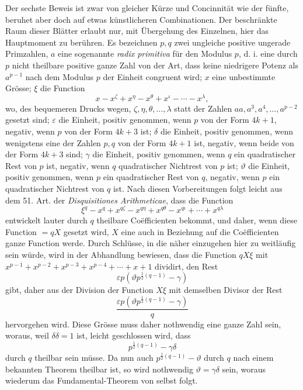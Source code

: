 \documentclass[12pt]{article}
\begin{document}
Der sechste Beweis ist zwar von gleicher Kürze und Concinnität wie der fünfte, beruhet aber doch auf etwas künstlicheren Combinationen. Der beschränkte Raum dieser Blätter erlaubt nur, mit Übergehung des Einzelnen, hier das Hauptmoment zu berühren. Es bezeichnen $p,q$ zwei ungleiche positive ungerade Primzahlen, $a$ eine sogenannte \textit{radix primitiva} für den Modulus $p$, d. i. eine durch $p$ nicht theilbare positive ganze Zahl von der Art, dass keine niedrigere Potenz als $a^{p-1}$ nach dem Modulus $p$ der Einheit congruent wird; $x$ eine unbestimmte Grösse; $\xi$ die Function
\[
x-x^\zeta+x^\eta-x^\theta+x^\iota-\cdots-x^\lambda,
\]
wo, des bequemeren Drucks wegen, $\zeta,\eta,\theta,\ldots,\lambda$ statt der Zahlen $aa,a^3,a^4,\ldots,a^{p-2}$ gesetzt sind; $\varepsilon$ die Einheit, positiv genommen, wenn $p$ von der Form $4k+1$, negativ, wenn $p$ von der Form $4k+3$ ist; $\delta$ die Einheit, positiv genommen, wenn wenigstens eine der Zahlen $p,q$ von der Form $4k+1$ ist, negativ, wenn beide von der Form $4k+3$ sind; $\gamma$ die Einheit, positiv genommen, wenn $q$ ein quadratischer Rest von $p$ ist, negativ, wenn $q$ quadratischer Nichtrest von $p$ ist; $\vartheta$ die Einheit, positiv genommen, wenn $p$ ein quadratischer Rest von $q$, negativ, wenn $p$ ein quadratischer Nichtrest von $q$ ist. Nach diesen Vorbereitungen folgt leicht aus dem 51. Art. der \textit{Disquisitiones Arithmeticae}, dass die Function
\[
\xi^q-x^q+x^{q\zeta}-x^{q\eta}+x^{q\theta}-x^{q\iota}+\cdots+x^{q\lambda}
\]
entwickelt lauter durch $q$ theilbare Coëfficienten bekommt, und daher, wenn diese Function $=qX$ gesetzt wird, $X$ eine auch in Beziehung auf die Coëfficienten ganze Function werde. Durch Schlüsse, in die näher einzugehen hier zu weitläufig sein würde, wird in der Abhandlung bewiesen, dass die Function $qX\xi$ mit $x^{p-1}+x^{p-2}+x^{p-3}+x^{p-4}+\cdots+x+1$ dividirt, den Rest
\[
\varepsilon p(\vartheta p^{\frac12(q-1)}-\gamma)
\]
gibt, daher aus der Division der Function $X\xi$ mit demselben Divisor der Rest
\[
\frac{\varepsilon p(\vartheta p^{\frac12(q-1)}-\gamma)}{q}
\]
hervorgehen wird. Diese Grösse muss daher nothwendig eine ganze Zahl sein, woraus, weil $\delta\delta=1$ ist, leicht geschlossen wird, dass
\[
p^{\frac12(q-1)}-\gamma\delta
\]
durch $q$ theilbar sein müsse. Da nun auch $p^{\frac12(q-1)}-\vartheta$ durch $q$ nach einem bekannten Theorem theilbar ist, so wird nothwendig $\vartheta=\gamma\delta$ sein, woraus wiederum das Fundamental-Theorem von selbst folgt.
\end{document}
